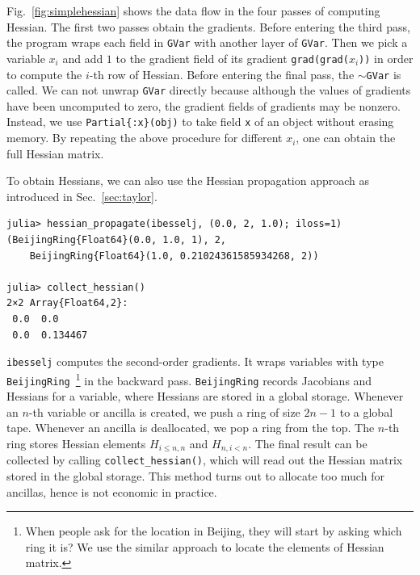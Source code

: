 \documentclass{article}
\newcommand{\<}{\langle}
\renewcommand{\>}{\rangle}
\newcommand{\Fig}[1]{Fig.~\ref{#1}}
\newcommand{\Sec}[1]{Sec.~\ref{#1}}
\theoremstyle{definition}\newtheorem{definition}{\textit{Definition}}
\begin{document}
\Fig{fig:simplehessian} shows the data flow in the four passes of computing Hessian. The first two passes obtain the gradients. Before entering the third pass, the program wraps each field in \texttt{GVar} with another layer of \texttt{GVar}. Then we pick a variable $x_i$ and add $1$ to the gradient field of its gradient \texttt{grad(grad($x_i$))} in order to compute the $i$-th row of Hessian. Before entering the final pass, the \texttt{$\sim$GVar} is called. We can not unwrap \texttt{GVar} directly because although the values of gradients have been uncomputed to zero, the gradient fields of gradients may be nonzero. Instead, we use \texttt{Partial\{:x\}(obj)} to take field \texttt{x} of an object without erasing memory. By repeating the above procedure for different $x_i$, one can obtain the full Hessian matrix.

To obtain Hessians, we can also use the Hessian propagation approach as introduced in \Sec{sec:taylor}.

\begin{minipage}{.88\columnwidth}
\begin{lstlisting}
julia> hessian_propagate(ibesselj, (0.0, 2, 1.0); iloss=1)
(BeijingRing{Float64}(0.0, 1.0, 1), 2,
    BeijingRing{Float64}(1.0, 0.21024361585934268, 2))

julia> collect_hessian()
2×2 Array{Float64,2}:
 0.0  0.0     
 0.0  0.134467
\end{lstlisting}
\end{minipage}

\texttt{ibesselj\textquotesingle\textquotesingle} computes the second-order gradients. It wraps variables with type \texttt{BeijingRing}~\footnote{When people ask for the location in Beijing, they will start by asking which ring it is? We use the similar approach to locate the elements of Hessian matrix.} in the backward pass. \texttt{BeijingRing} records Jacobians and Hessians for a variable, where Hessians are stored in a global storage.
Whenever an $n$-th variable or ancilla is created, we push a ring of size $2n-1$ to a global tape. Whenever an ancilla is deallocated, we pop a ring from the top. The $n$-th ring stores Hessian elements $H_{i\leq n,n}$ and $H_{n,i<n}$.%
The final result can be collected by calling \texttt{collect\_hessian()}, which will read out the Hessian matrix stored in the global storage.
This method turns out to allocate too much for ancillas, hence is not economic in practice.
\end{document}

